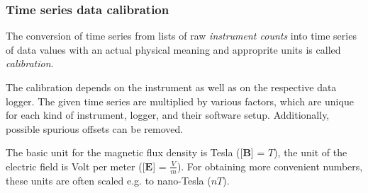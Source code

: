 \subsubsection{Time series data calibration}

The conversion of  time series from lists of raw \textit{instrument counts} into time series of data values with an actual physical meaning and approprite units is called \textit{calibration}.

The calibration depends on  the instrument as well as on the respective data logger. The given time series are multiplied by various factors, which are unique for each kind of instrument,  logger, and their software setup. Additionally, possible spurious offsets can be removed.

The basic unit for the magnetic flux density is Tesla ([$\mathbf{B}$] = $T$), the unit of the electric field is Volt per meter ([$\mathbf{E}$] = $\frac{V}{m}$). For obtaining more convenient numbers, these units are often scaled e.g. to nano-Tesla ($nT$).




